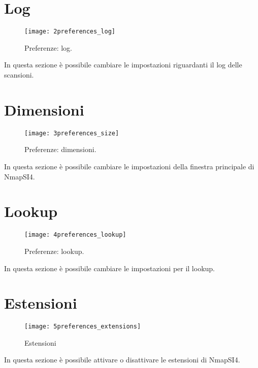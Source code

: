 \section{Log}
\label{sec:PreferencesLog}

\begin{figure}[h]
  \centering
  \texttt{[image: 2preferences\_log]}
  \caption{Preferenze: log.}
  \label{fig:PreferencesLog}
\end{figure}
In questa sezione \`e possibile cambiare le impostazioni riguardanti il log 
delle scansioni.

\section{Dimensioni}
\label{sec:PreferencesDimensions}

\begin{figure}[h]
  \centering
  \texttt{[image: 3preferences\_size]}
  \caption{Preferenze: dimensioni.}
  \label{fig:PreferencesDimensions}
\end{figure}
In questa sezione \`e possibile cambiare le impostazioni della finestra 
principale di NmapSI4.

\section{Lookup}
\label{sec:PreferencesLookup}

\begin{figure}[h]
  \centering
  \texttt{[image: 4preferences\_lookup]}
  \caption{Preferenze: lookup.}
  \label{fig:PreferencesLookup}
\end{figure}
In questa sezione \`e possibile cambiare le impostazioni per il lookup.

\section{Estensioni}
\label{sec:PreferencesExtensions}

\begin{figure}[h]
  \centering
  \texttt{[image: 5preferences\_extensions]}
  \caption{Estensioni}
  \label{fig:PreferencesExtensions}
\end{figure}
In questa sezione \`e possibile attivare o disattivare le estensioni di NmapSI4.

